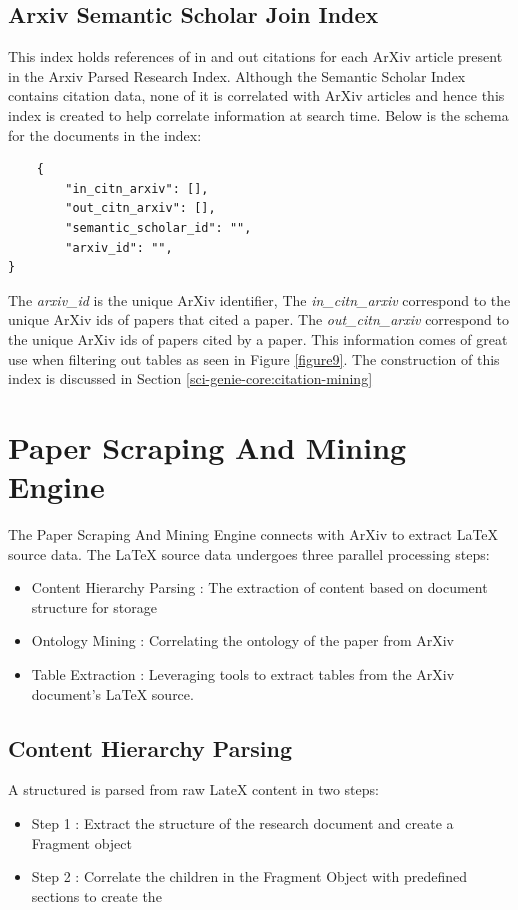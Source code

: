 \subsection{Arxiv Semantic Scholar Join Index}
\label{sci-genie-core:data-layer:ss-join-index}
This index holds references of in and out citations for each ArXiv article present in the Arxiv Parsed Research Index. Although the Semantic Scholar Index contains citation data, none of it is correlated with ArXiv articles and hence this index is created to help correlate information at search time. Below is the schema for the documents in the index: 
\begin{verbatim}
    {
        "in_citn_arxiv": [],
        "out_citn_arxiv": [],
        "semantic_scholar_id": "",
        "arxiv_id": "",
}
\end{verbatim}
The \textit{arxiv\_id} is the unique ArXiv identifier, The \textit{in\_citn\_arxiv} correspond to the unique ArXiv ids of papers that cited a paper. The \textit{out\_citn\_arxiv} correspond to the unique ArXiv ids of papers cited by a paper. This information comes of great use when filtering out tables as seen in Figure \ref{figure9}. The construction of this index is discussed in Section \ref{sci-genie-core:citation-mining}
\section{Paper Scraping And Mining Engine}
\label{sci-genie-core:scraping}
The Paper Scraping And Mining Engine connects with ArXiv to extract LaTeX source data. The LaTeX source data undergoes three parallel processing steps:
\begin{itemize}
    \item Content Hierarchy Parsing : The extraction of content based on document structure for storage
    \item Ontology Mining : Correlating the ontology of the paper from ArXiv
    \item Table Extraction : Leveraging tools to extract tables from the ArXiv document's LaTeX source.
\end{itemize}

\subsection{Content Hierarchy Parsing}
A structured  is parsed from raw LateX content in two steps:
\begin{itemize}
    \item Step 1 : Extract the structure of the research document and create a Fragment object
    \item Step 2 : Correlate the children in the Fragment Object with predefined sections to create the  
\end{itemize} 
